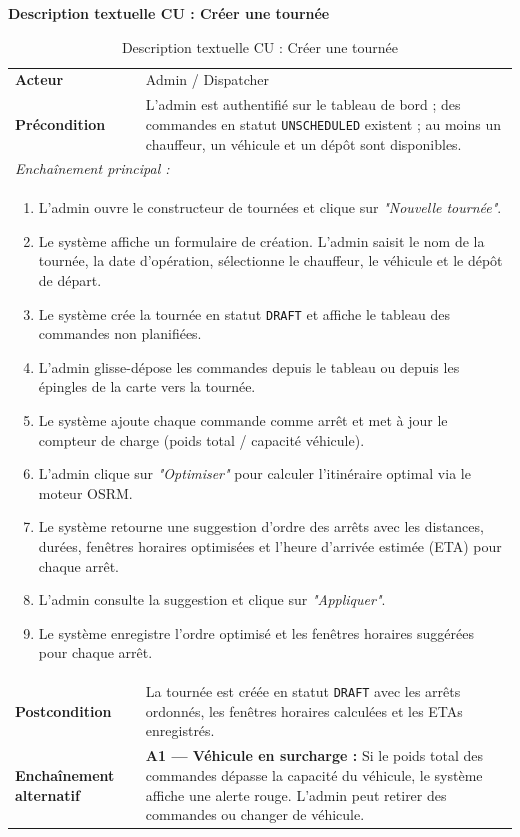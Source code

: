 \textbf{Description textuelle CU : Créer une tournée}

\begin{longtable}{|p{3.5cm}|p{11.5cm}|}
\caption{Description textuelle CU : Créer une tournée} \\
\hline
\rowcolor{primary!10}
\multicolumn{2}{|c|}{\textbf{CU : Créer une tournée}} \\
\hline
\textbf{Acteur} & Admin / Dispatcher \\
\hline
\textbf{Précondition} &
  L'admin est authentifié sur le tableau de bord ; des commandes en statut
  \texttt{UNSCHEDULED} existent ; au moins un chauffeur, un véhicule et un
  dépôt sont disponibles. \\
\hline
\multicolumn{2}{|l|}{\textit{Enchaînement principal :}} \\
\hline
\multicolumn{2}{|p{15.4cm}|}{
  \begin{enumerate}[leftmargin=1.5cm]
    \item L'admin ouvre le constructeur de tournées et clique sur
          \textit{"Nouvelle tournée"}.
    \item Le système affiche un formulaire de création. L'admin saisit le nom
          de la tournée, la date d'opération, sélectionne le chauffeur, le
          véhicule et le dépôt de départ.
    \item Le système crée la tournée en statut \texttt{DRAFT} et affiche
          le tableau des commandes non planifiées.
    \item L'admin glisse-dépose les commandes depuis le tableau ou depuis les
          épingles de la carte vers la tournée.
    \item Le système ajoute chaque commande comme arrêt et met à jour
          le compteur de charge (poids total / capacité véhicule).
    \item L'admin clique sur \textit{"Optimiser"} pour calculer l'itinéraire
          optimal via le moteur OSRM.
    \item Le système retourne une suggestion d'ordre des arrêts avec les
          distances, durées, fenêtres horaires optimisées et l'heure
          d'arrivée estimée (ETA) pour chaque arrêt.
    \item L'admin consulte la suggestion et clique sur \textit{"Appliquer"}.
    \item Le système enregistre l'ordre optimisé et les fenêtres horaires
          suggérées pour chaque arrêt.
  \end{enumerate}
} \\
\hline
\textbf{Postcondition} &
  La tournée est créée en statut \texttt{DRAFT} avec les arrêts ordonnés,
  les fenêtres horaires calculées et les ETAs enregistrés. \\
\hline
\textbf{Enchaînement alternatif} &
  \textbf{A1 — Véhicule en surcharge :} Si le poids total des commandes
  dépasse la capacité du véhicule, le système affiche une alerte rouge.
  L'admin peut retirer des commandes ou changer de véhicule.


\end{longtable}

